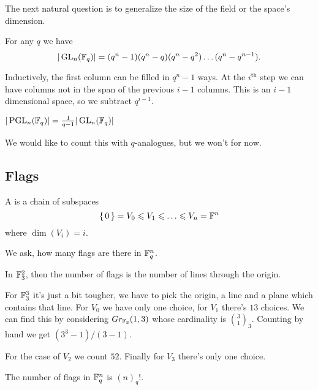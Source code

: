 \documentclass[12pt]{memoir}
\begin{document}
The next natural question is to generalize the size of the field or the space's dimension.

\begin{Th}
    For any $q$ we have 
    $$|\operatorname{GL}_n(\mathbb{F}_q)|=(q^n-1)(q^n-q)(q^n-q^2)\dots(q^n-q^{n-1}).$$ 
\end{Th}

\begin{ptcbp}
    Inductively, the first column can be filled in $q^n-1$ ways. At the $i^{\text{th}}$ step we can have columns not in the span of the previous $i-1$ columns. This is an $i-1$ dimensional space, so we subtract $q^{i-1}$.
\end{ptcbp}

\begin{Cor}
    $|\operatorname{PGL}_n(\mathbb{F}_q)|=\frac{1}{q-1}|\operatorname{GL}_n(\mathbb{F}_q)|$
\end{Cor}

We would like to count this with $q$-analogues, but we won't for now.

\subsection{Flags}

\begin{Def}
A  is a chain of subspaces 
$$\set{0}=V_0\leq V_1\leq\dots\leq V_n=\bF^n$$
where $\dim(V_i)=i$.    
\end{Def}

We ask, how many flags are there in $\mathbb{F}^n_q$.

\begin{Ex}
    In $\mathbb{F}_3^2$, then the number of flags is the number of lines through the origin.\par 
    For $\mathbb{F}^3_3$ it's just a bit tougher, we have to pick the origin, a line and a plane which contains that line. For $V_0$ we have only one choice, for $V_1$ there's $13$ choices. We can find this by considering $Gr_{\mathbb{F}_3}(1,3)$ whose cardinality is $\binom{3}{1}_3$. Counting by hand we get $(3^3-1)/(3-1)$.\par 
    For the case of $V_2$ we count $52$. Finally for $V_3$ there's only one choice.
\end{Ex}

\begin{Th}
    The number of flags in $\mathbb{F}^n_q$ is $(n)_q!$. 
\end{Th}
\end{document}
